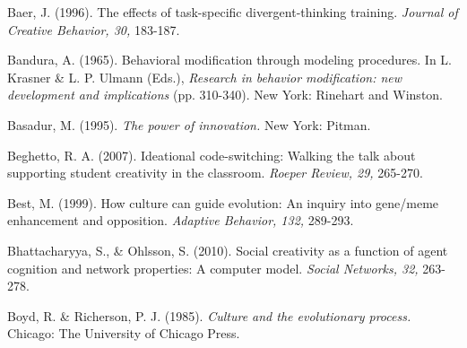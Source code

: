 \documentclass[a4paper,12pt,man,british]{apa6}
\begin{document}
\begin{description}

\item Baer, J. (1996). The effects of task-specific divergent-thinking training. \emph{Journal of Creative Behavior, 30,} 183-187.

\item Bandura, A. (1965). Behavioral modification through modeling procedures. In L. Krasner \& L. P. Ulmann (Eds.), \emph{Research in behavior modification: new development and implications} (pp. 310-340). New York: Rinehart and Winston.

\item Basadur, M. (1995). \emph{The power of innovation.} New York: Pitman.



\item Beghetto, R. A. (2007). Ideational code-switching: Walking the talk about supporting student creativity in the classroom. \emph{Roeper Review, 29,} 265-270.



\item Best, M. (1999). How culture can guide evolution: An inquiry into gene/meme enhancement and opposition. \emph{Adaptive Behavior, 132,} 289-293.

\item Bhattacharyya, S., \& Ohlsson, S. (2010). Social creativity as a function of agent cognition and network properties: A computer model. \emph{Social Networks, 32,} 263-278.

\item Boyd, R. \& Richerson, P. J. (1985). \emph{Culture and the evolutionary process.} Chicago: The University of Chicago Press.


\end{description}
\end{document}
